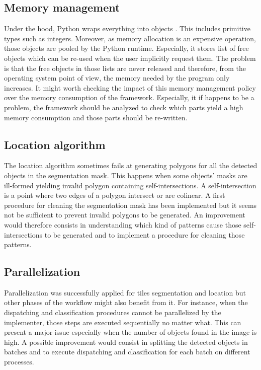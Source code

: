 \subsection{Memory management}
Under the hood, Python wraps everything into objects \cite{pythonleaks2016}. This includes primitive types such as integers. Moreover, as memory allocation is an expensive operation, those objects are pooled by the Python runtime. Especially, it stores list of free objects which can be re-used when the user implicitly request them. The problem is that the free objects in those lists are never released and therefore, from the operating system point of view, the memory needed by the program only increases. It might worth checking the impact of this memory management policy over the memory consumption of the framework. Especially, it if happens to be a problem, the framework should be analyzed to check which parts yield a high memory consumption and those parts should be re-written.

\subsection{Location algorithm}
The location algorithm sometimes fails at generating polygons for all the detected objects in the segmentation mask. This happens when some objects' masks are ill-formed yielding invalid polygon containing self-intersections. A self-intersection is a point where two edges of a polygon intersect or are colinear. A first procedure for cleaning the segmentation mask has been implemented but it seems not be sufficient to prevent invalid polygons to be generated. An improvement would therefore consists in understanding which kind of patterns cause those self-intersections to be generated and to implement a procedure for cleaning those patterns. 

\subsection{Parallelization}
Parallelization was successfully applied for tiles segmentation and location but other phases of the workflow might also benefit from it. For instance, when the dispatching and classification procedures cannot be parallelized by the implementer, those steps are executed sequentially no matter what. This can present a major issue especially when the number of objects found in the image is high. A possible improvement would consist in splitting the detected objects in batches and to execute dispatching and classification for each batch on different processes. 


